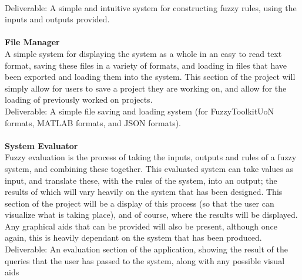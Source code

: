 \documentclass[a4paper,twoside,notitlepage,11pt]{article}
\begin{document}
\ \\
Deliverable: A simple and intuitive system for constructing fuzzy rules, using the inputs and outputs provided.\ \\
\ \\
\noindent
\textbf{File Manager}\ \\
A simple system for displaying the system as a whole in an easy to read text format, saving these files in a variety of formats, and loading in files that have been exported and loading them into the system. This section of the project will simply allow for users to save a project they are working on, and allow for the loading of previously worked on projects.
\ \\
Deliverable: A simple file saving and loading system (for FuzzyToolkitUoN formats, MATLAB formats, and JSON formats).\ \\
\ \\
\noindent
\textbf{System Evaluator}\ \\
Fuzzy evaluation is the process of taking the inputs, outputs and rules of a fuzzy system, and combining these together. This evaluated system can take values as input, and translate these, with the rules of the system, into an output; the results of which will vary heavily on the system that has been designed. This section of the project will be a display of this process (so that the user can visualize what is taking place), and of course, where the results will be displayed. Any graphical aids that can be provided will also be present, although once again, this is heavily dependant on the system that has been produced.
\ \\
Deliverable: An evaluation section of the application, showing the result of the queries that the user has passed to the system, along with any possible visual aids\ \\
\ \\
\end{document}

